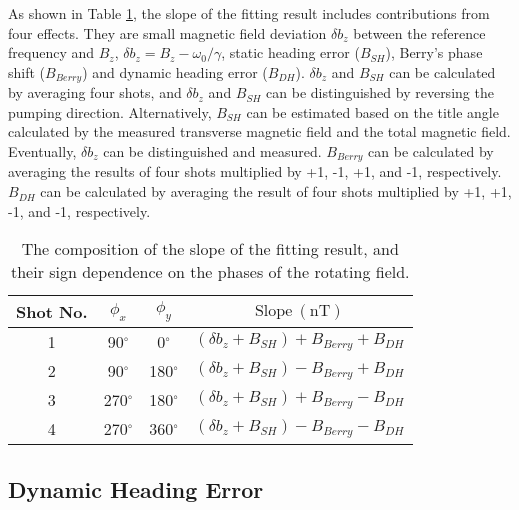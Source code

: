\documentclass[prx,twocolumn,10pt,nofootinbib]{revtex4-1}
\begin{document}
As shown in Table \ref{table:slope}, the slope of the fitting result includes contributions from four effects. They are small magnetic field deviation $\delta b_z$ between the reference frequency and $B_z$, $\delta b_z=B_z - \omega_0/\gamma$, static heading error ($B_{SH}$), Berry's phase shift ($B_{Berry}$) and dynamic heading error ($B_{DH}$). $\delta b_z$ and $B_{SH}$ can be calculated by averaging four shots, and $\delta b_z$ and $B_{SH}$ can be distinguished by reversing the pumping direction. Alternatively, $B_{SH}$ can be estimated based on the title angle calculated by the measured transverse magnetic field and the total magnetic field. Eventually, $\delta b_z$ can be distinguished and measured. $B_{Berry}$ can be calculated by averaging the results of four shots multiplied by +1, -1, +1, and -1, respectively. $B_{DH}$ can be calculated by averaging the result of four shots multiplied by +1, +1, -1, and -1, respectively.
\begin{table}[]
\centering
\begin{tabular}{|c|c|c|c|}
\hline
\textbf{Shot No.} & \textbf{$\phi_x$} & \textbf{$\phi_y$} & \textbf{$\mathrm{Slope ~(nT)}$} \\ \hline
1 & 90$^{\circ}$ & 0$^{\circ}$ & $(\delta b_z +B_{SH}) + B_{Berry}+B_{DH}$ \\ \hline
2 & 90$^{\circ}$ & 180$^{\circ}$ & $(\delta b_z +B_{SH}) - B_{Berry}+B_{DH} $ \\ \hline
3 & 270$^{\circ}$ & 180$^{\circ}$ & $(\delta b_z +B_{SH}) + B_{Berry}-B_{DH} $ \\ \hline
4 & 270$^{\circ}$ & 360$^{\circ}$ & $(\delta b_z +B_{SH}) - B_{Berry}-B_{DH} $ \\ \hline
\end{tabular}
\caption{The composition of the slope of the fitting result, and their sign dependence on the phases of the rotating field. }
\label{table:slope}
\end{table}



\subsection{Dynamic Heading Error}

\end{document}
